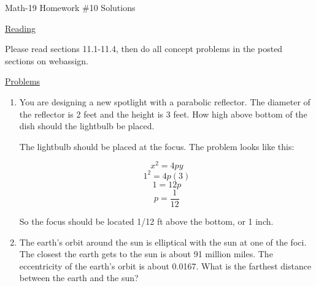 \documentclass[letterpaper,12pt,fleqn]{article}
\begin{document}
\begin{center}
\Large Math-19 Homework \#10 Solutions
\end{center}

\vspace{0.5in}

\underline{Reading}

Please read sections 11.1-11.4, then do all concept problems in the posted
sections on web\-assign.

\underline{Problems}

\begin{enumerate}
\item You are designing a new spotlight with a parabolic reflector. The
  diameter of the reflector is 2 feet and the height is 3 feet. How high above
  bottom of the dish should the lightbulb be placed.

  The lightbulb should be placed at the focus. The problem looks like this:


  \[x^2=4py\]
  \[1^2=4p(3)\]
  \[1=12p\]
  \[p=\frac{1}{12}\]

  So the focus should be located 1/12 ft above the bottom, or 1 inch.

  \bigskip

\item The earth's orbit around the sun is elliptical with the sun at one of
  the foci. The closest the earth gets to the sun is about 91 million miles.
  The eccentricity of the earth's orbit is about 0.0167. What is the farthest
  distance between the earth and the sun?



\end{enumerate}
\end{document}
